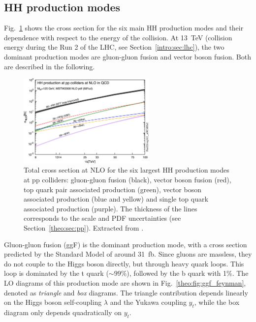 \documentclass[../main.tex]{subfiles}
\begin{document}
\subsection{HH production modes}

Fig.~\ref{theo:fig:hh_production_xs} shows the cross section for the six main HH production modes and their dependence with respect to the energy of the collision. At 13~TeV (collision energy during the Run 2 of the LHC, see Section~\ref{intro:sec:lhc}), the two dominant production modes are gluon-gluon fusion and vector boson fusion. Both are described in the following.


\begin{figure}[h!]
\begin{center}
\includegraphics[width=0.6\textwidth]{Images/hh_production_xs}
\end{center}
\caption{Total cross section at NLO for the six largest HH production modes at pp colliders: gluon-gluon fusion (black), vector boson fusion (red), top quark pair associated production (green), vector boson associated production (blue and yellow) and single top quark associated production (purple). The thickness of the lines corresponds to the scale and PDF uncertainties (see Section~\ref{theo:sec:pp}). Extracted from \cite{intro:theo:hh_prod_modes}.}
\label{theo:fig:hh_production_xs}
\end{figure}


Gluon-gluon fusion (ggF) is the dominant production mode, with a cross section predicted by the Standard Model of around 31~fb. Since gluons are massless, they do not couple to the Higgs boson directly, but through heavy quark loops. This loop is dominated by the t quark ($\sim99\%$), followed by the b quark with 1\%. The LO diagrams of this production mode are shown in Fig.~\ref{theo:fig:ggf_feynman}, denoted as \textit{triangle} and \textit{box} diagrams. The triangle contribution depends linearly on the Higgs boson self-coupling $\lambda$ and the Yukawa coupling $y_t$, while the box diagram only depends quadratically on $y_t$.
\end{document}
